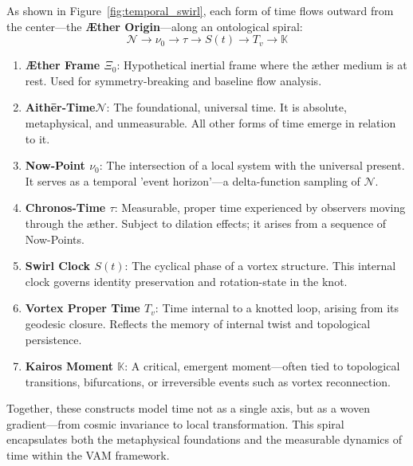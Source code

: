 \documentclass[12pt]{article}
\begin{document}
\noindent As shown in Figure~\ref{fig:temporal_swirl}, each form of time flows outward from the center—the \textbf{Æther Origin}—along an ontological spiral:
$$ \mathcal{N} \longrightarrow \nu_0 \longrightarrow \tau \longrightarrow S(t) \longrightarrow T_v \longrightarrow \mathbb{K} $$
\begin{enumerate}
    \item \textbf{Æther Frame \( \Xi_0 \)}:   Hypothetical inertial frame where the æther medium is at rest. Used for symmetry-breaking and baseline flow analysis.
    \item \textbf{Aithēr-Time\( \mathcal{N} \)}: The foundational, universal time. It is absolute, metaphysical, and unmeasurable. All other forms of time emerge in relation to it.
    \item \textbf{Now-Point \( \nu_0 \)}: The intersection of a local system with the universal present. It serves as a temporal 'event horizon'—a delta-function sampling of \( \mathcal{N} \).

    \item \textbf{Chronos-Time \( \tau \)}: Measurable, proper time experienced by observers moving through the æther. Subject to dilation effects; it arises from a sequence of Now-Points.

    \item \textbf{Swirl Clock \( S(t) \)}: The cyclical phase of a vortex structure. This internal clock governs identity preservation and rotation-state in the knot.

    \item \textbf{Vortex Proper Time \( T_v \)}: Time internal to a knotted loop, arising from its geodesic closure. Reflects the memory of internal twist and topological persistence.

    \item \textbf{Kairos Moment \( \mathbb{K} \)}: A critical, emergent moment—often tied to topological transitions, bifurcations, or irreversible events such as vortex reconnection.
\end{enumerate}

Together, these constructs model time not as a single axis, but as a woven gradient—from cosmic invariance to local transformation. This spiral encapsulates both the metaphysical foundations and the measurable dynamics of time within the VAM framework.
\end{document}

